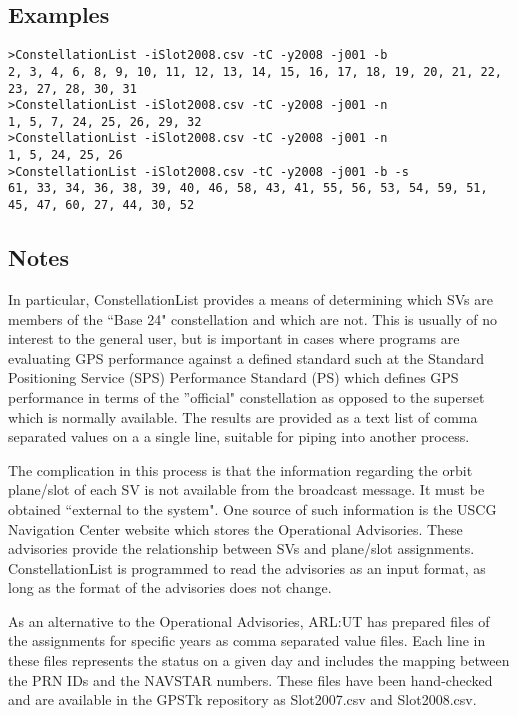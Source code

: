 \subsection{Examples}
\begin{\outputsize}
\begin{verbatim}
>ConstellationList -iSlot2008.csv -tC -y2008 -j001 -b
2, 3, 4, 6, 8, 9, 10, 11, 12, 13, 14, 15, 16, 17, 18, 19, 20, 21, 22, 23, 27, 28, 30, 31
>ConstellationList -iSlot2008.csv -tC -y2008 -j001 -n
1, 5, 7, 24, 25, 26, 29, 32
>ConstellationList -iSlot2008.csv -tC -y2008 -j001 -n
1, 5, 24, 25, 26
>ConstellationList -iSlot2008.csv -tC -y2008 -j001 -b -s
61, 33, 34, 36, 38, 39, 40, 46, 58, 43, 41, 55, 56, 53, 54, 59, 51, 45, 47, 60, 27, 44, 30, 52
\end{verbatim}
\end{\outputsize}

\subsection{Notes}
In particular, ConstellationList provides a means of determining which SVs are members of the ``Base 24" constellation and which are not. This is usually of no interest to the general user, but is important in cases where programs are evaluating GPS performance against a defined standard such at the Standard Positioning Service (SPS) Performance Standard (PS) which defines GPS performance in terms of the ''official" constellation as opposed to the superset which is normally available. The results are provided as a text list of comma separated values on a a single line, suitable for piping into another process.

The complication in this process is that the information regarding the orbit plane/slot of each SV is not available from the broadcast message. It must be obtained ``external to the system". One source of such information is the USCG Navigation Center website which stores the Operational Advisories. These advisories provide the relationship between SVs and plane/slot assignments. ConstellationList is programmed to read the advisories as an input format, as long as the format of the advisories does not change.

As an alternative to the Operational Advisories, ARL:UT has prepared files of the assignments for specific years as comma separated value files. Each line in these files represents the status on a given day and includes the mapping between the PRN IDs and the NAVSTAR numbers. These files have been hand-checked and are available in the GPSTk repository as Slot2007.csv and Slot2008.csv. 
%

